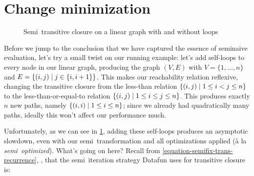 \section{Change minimization}

\label{section-change-minimization}

\begin{figure}
  \centering\small\sffamily
  \caption{Semi\naive\ transitive closure on a linear graph with and without loops}
  \label{figure-loops-kill-us}
\end{figure}

Before we jump to the conclusion that we have captured the essence of seminaive evaluation, let's try a small twist on our running example: let's add self-loops to every node in our linear graph, producing the graph $(V,E)$ with $V = \{1, ..., n\}$ and $E = \{(i,j) \mathrel{|} j \in \{i,i+1\}\}$.
%
This makes our reachability relation reflexive, changing the transitive closure from the less-than relation $\{(i,j) \mathrel{|} 1 \le i < j \le n\}$ to the less-than-or-equal-to relation $\{(i,j) \mathrel{|} 1 \le i \le j \le n\}$.
%
This produces exactly $n$ new paths, namely $\{(i,i) \mathrel{|} 1 \le i \le n\}$; since we already had quadratically many paths, ideally this won't affect our performance much.

Unfortunately, as we can see in \cref{figure-loops-kill-us}, adding these self-loops produces an asymptotic slowdown, even with our semi\naive\ transformation and all optimizations applied (\`a la \emph{semi\naive\ optimized}).
%
What's going on here?
%
Recall from \cref{equation-semifix-trans-recurrence}, , that the semi\naive\ iteration strategy Datafun uses for transitive closure is:

